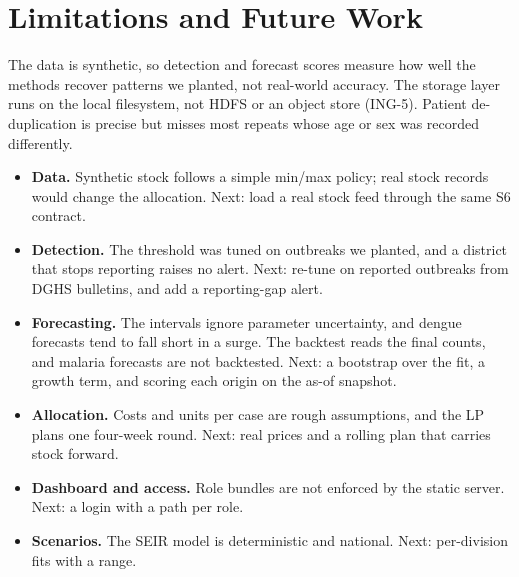 \section{Limitations and Future Work}
The data is synthetic, so detection and forecast scores measure how well the methods recover patterns we
planted, not real-world accuracy. The storage layer runs on the local filesystem, not HDFS or an object store
(ING-5). Patient de-duplication is precise but misses most repeats whose age or sex was recorded differently.
\begin{itemize}
\item \textbf{Data.} Synthetic stock follows a simple min/max policy; real stock records would change the
allocation. Next: load a real stock feed through the same S6 contract.
\item \textbf{Detection.} The threshold was tuned on outbreaks we planted, and a district that stops reporting
raises no alert. Next: re-tune on reported outbreaks from DGHS bulletins, and add a reporting-gap alert.
\item \textbf{Forecasting.} The intervals ignore parameter uncertainty, and dengue forecasts tend to fall short
in a surge. The backtest reads the final counts, and malaria forecasts are not backtested. Next: a bootstrap
over the fit, a growth term, and scoring each origin on the as-of snapshot.
\item \textbf{Allocation.} Costs and units per case are rough assumptions, and the LP plans one four-week round.
Next: real prices and a rolling plan that carries stock forward.
\item \textbf{Dashboard and access.} Role bundles are not enforced by the static server. Next: a login with a
path per role.
\item \textbf{Scenarios.} The SEIR model is deterministic and national. Next: per-division fits with a range.
\end{itemize}
